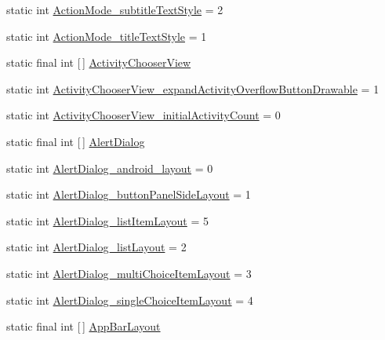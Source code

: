 \begin{DoxyCompactItemize}
\item 
static int \hyperlink{classandroid_1_1support_1_1v4_1_1R_1_1styleable_adf85b77127f085c08ae9f7876b127ae8}{Action\+Mode\+\_\+subtitle\+Text\+Style} = 2
\item 
static int \hyperlink{classandroid_1_1support_1_1v4_1_1R_1_1styleable_a76cacf108986d54131f84ffbda5ddc84}{Action\+Mode\+\_\+title\+Text\+Style} = 1
\item 
static final int \mbox{[}$\,$\mbox{]} \hyperlink{classandroid_1_1support_1_1v4_1_1R_1_1styleable_ab8c1a7f930b02f15ae84e9f2d388782a}{Activity\+Chooser\+View}
\item 
static int \hyperlink{classandroid_1_1support_1_1v4_1_1R_1_1styleable_a2eaae469c371865645bb2a33c1facfd5}{Activity\+Chooser\+View\+\_\+expand\+Activity\+Overflow\+Button\+Drawable} = 1
\item 
static int \hyperlink{classandroid_1_1support_1_1v4_1_1R_1_1styleable_aa1a6488e82c41cad0b358240a62bd4bc}{Activity\+Chooser\+View\+\_\+initial\+Activity\+Count} = 0
\item 
static final int \mbox{[}$\,$\mbox{]} \hyperlink{classandroid_1_1support_1_1v4_1_1R_1_1styleable_a5116e3c5b33ab9db032c1574d2588f5e}{Alert\+Dialog}
\item 
static int \hyperlink{classandroid_1_1support_1_1v4_1_1R_1_1styleable_ae862e498d32925004193b65ed1bf4062}{Alert\+Dialog\+\_\+android\+\_\+layout} = 0
\item 
static int \hyperlink{classandroid_1_1support_1_1v4_1_1R_1_1styleable_aa80044c84d26c170ed55ef0d1b748000}{Alert\+Dialog\+\_\+button\+Panel\+Side\+Layout} = 1
\item 
static int \hyperlink{classandroid_1_1support_1_1v4_1_1R_1_1styleable_abd795c00cd69a69a92b9953b1ebe8394}{Alert\+Dialog\+\_\+list\+Item\+Layout} = 5
\item 
static int \hyperlink{classandroid_1_1support_1_1v4_1_1R_1_1styleable_a2d34538b1db2a88b217f6cd6dc60a8ff}{Alert\+Dialog\+\_\+list\+Layout} = 2
\item 
static int \hyperlink{classandroid_1_1support_1_1v4_1_1R_1_1styleable_a543519cd3d3b938c48d9d1c6133eba4b}{Alert\+Dialog\+\_\+multi\+Choice\+Item\+Layout} = 3
\item 
static int \hyperlink{classandroid_1_1support_1_1v4_1_1R_1_1styleable_ad05c2beadd3ba3e9770f1f84ec112b92}{Alert\+Dialog\+\_\+single\+Choice\+Item\+Layout} = 4
\item 
static final int \mbox{[}$\,$\mbox{]} \hyperlink{classandroid_1_1support_1_1v4_1_1R_1_1styleable_aa7c4e9c9d1655572bf8e4bfd804025c2}{App\+Bar\+Layout}

\end{DoxyCompactItemize}
